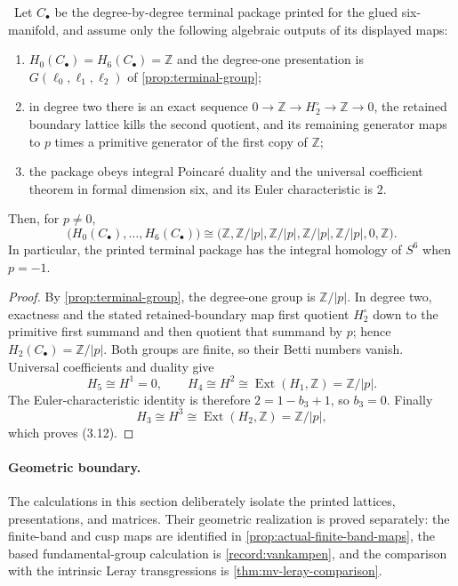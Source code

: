 \begin{proposition}
\label{prop:terminal-all-degree}
\Verified\ Let $C_\bullet$ be the degree-by-degree terminal package printed
for the glued six-manifold, and assume only the following algebraic outputs
of its displayed maps:
\begin{enumerate}[label=(\roman*)]
\item $H_0(C_\bullet)=H_6(C_\bullet)=\mathbb Z$ and the degree-one
presentation is $G(\ell_0,\ell_1,\ell_2)$ of
\cref{prop:terminal-group};
\item in degree two there is an exact sequence
$0\to\mathbb Z\to H_2^\circ\to\mathbb Z\to0$, the retained boundary
lattice kills the second quotient, and its remaining generator maps to
$p$ times a primitive generator of the first copy of $\mathbb Z$;
\item the package obeys integral Poincar\'e duality and the universal
coefficient theorem in formal dimension six, and its Euler characteristic
is $2$.
\end{enumerate}
Then, for $p\ne0$,
\[
 \bigl(H_0(C_\bullet),\ldots,H_6(C_\bullet)\bigr)
 \cong
 \bigl(\mathbb Z,\mathbb Z/|p|,\mathbb Z/|p|,
 \mathbb Z/|p|,\mathbb Z/|p|,0,\mathbb Z\bigr).
\tag{3.12}
\]
In particular, the printed terminal package has the integral homology of
$S^6$ when $p=-1$.
\end{proposition}

\begin{proof}
By \cref{prop:terminal-group}, the degree-one group is
$\mathbb Z/|p|$.  In degree two, exactness and the stated retained-boundary
map first quotient $H_2^\circ$ down to the primitive first summand and then
quotient that summand by $p$; hence $H_2(C_\bullet)=\mathbb Z/|p|$.
Both groups are finite, so their Betti numbers vanish.  Universal
coefficients and duality give
\[
 H_5\cong H^1=0,
 \qquad
 H_4\cong H^2\cong
 \operatorname{Ext}(H_1,\mathbb Z)=\mathbb Z/|p|.
\]
The Euler-characteristic identity is therefore
$2=1-b_3+1$, so $b_3=0$.  Finally
\[
 H_3\cong H^3\cong
 \operatorname{Ext}(H_2,\mathbb Z)=\mathbb Z/|p|,
\]
which proves (3.12).
\end{proof}

\paragraph{Geometric boundary.}
The calculations in this section deliberately isolate the printed lattices,
presentations, and matrices.  Their geometric realization is proved
separately: the finite-band and cusp maps are identified in
\cref{prop:actual-finite-band-maps}, the based fundamental-group calculation
is \cref{record:vankampen}, and the comparison with the intrinsic Leray
transgressions is \cref{thm:mv-leray-comparison}.
